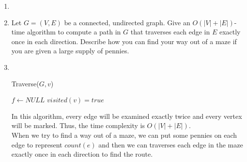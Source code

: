 \documentclass[12pt,a4paper]{article}
\makeatletter
\newtheorem*{solution}{Solution}
\theoremstyle{definition}
\renewenvironment{solution}[1][Solution] {\par\pushQED{\qed}\normalfont\topsep6\p@\@plus6\p@\relax\trivlist\item[\hskip\labelsep\bfseries#1\@addpunct{.}]\ignorespaces}{\popQED\endtrivlist\@endpefalse} \makeatother
\makeatother
\begin{document}
\begin{enumerate}
\begin{solution}
\begin{enumerate}
	\end{enumerate}
	\end{solution}
    \item Let $G=(V,E)$ be a connected, undirected graph. Give an $O(|V|+|E|)$-time algorithm
    to compute a path in $G$ that traverses each edge in $E$ exactly once in each direction. Describe how you can find your way out of a maze if you are given a large supply of pennies.
    
    \begin{solution}
    ~\\
    \begin{minipage}[t]{0.8\textwidth}
        \begin{algorithm}[H]
            		
        \BlankLine
        \caption{Traverse($G,v$)}
        \label{traverse}
        $f\leftarrow NULL$\;
        $visited(v)=true$\;
        \end{algorithm}
    \end{minipage}
    
    In this algorithm, every edge will be examined exactly twice and every vertex will be marked. Thus, the time complexity is $O(|V|+|E|)$.\\
    When we try to find a way out of a maze, we can put some pennies on each edge to represent $count(e)$ and then we can traverses each edge in the maze exactly once in each direction to find the route. 
    
    
    \end{solution}


\end{enumerate}
\end{document}
